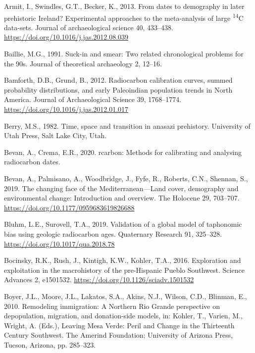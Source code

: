 \documentclass[
]{sa}
\newlength{\cslhangindent}
\newenvironment{cslreferences}%
  {\setlength{\parindent}{0pt}%
  \everypar{\setlength{\hangindent}{\cslhangindent}}\ignorespaces}%
  {\par}
\begin{document}
\hypertarget{refs}{}
\begin{cslreferences}
\leavevmode\hypertarget{ref-Armit2013}{}%
Armit, I., Swindles, G.T., Becker, K., 2013. From dates to demography in later prehistoric Ireland? Experimental approaches to the meta-analysis of large \textsuperscript{14}C data-sets. Journal of archaeological science 40, 433--438. \url{https://doi.org/10.1016/j.jas.2012.08.039}

\leavevmode\hypertarget{ref-Baillie1991}{}%
Baillie, M.G., 1991. Suck-in and smear: Two related chronological problems for the 90s. Journal of theoretical archaeology 2, 12--16.

\leavevmode\hypertarget{ref-Bamforth2012}{}%
Bamforth, D.B., Grund, B., 2012. Radiocarbon calibration curves, summed probability distributions, and early Paleoindian population trends in North America. Journal of Archaeological Science 39, 1768--1774. \url{https://doi.org/10.1016/j.jas.2012.01.017}

\leavevmode\hypertarget{ref-Berry1982}{}%
Berry, M.S., 1982. Time, space and transition in anasazi prehistory. University of Utah Press, Salt Lake City, Utah.

\leavevmode\hypertarget{ref-rcarbon}{}%
Bevan, A., Crema, E.R., 2020. rcarbon: Methods for calibrating and analysing radiocarbon dates.

\leavevmode\hypertarget{ref-Bevan2019}{}%
Bevan, A., Palmisano, A., Woodbridge, J., Fyfe, R., Roberts, C.N., Shennan, S., 2019. The changing face of the Mediterranean---Land cover, demography and environmental change: Introduction and overview. The Holocene 29, 703--707. \url{https://doi.org/10.1177/0959683619826688}

\leavevmode\hypertarget{ref-Bluhm2019}{}%
Bluhm, L.E., Surovell, T.A., 2019. Validation of a global model of taphonomic bias using geologic radiocarbon ages. Quaternary Research 91, 325--328. \url{https://doi.org/10.1017/qua.2018.78}

\leavevmode\hypertarget{ref-Bocinsky2016}{}%
Bocinsky, R.K., Rush, J., Kintigh, K.W., Kohler, T.A., 2016. Exploration and exploitation in the macrohistory of the pre-Hispanic Pueblo Southwest. Science Advances 2, e1501532. \url{https://doi.org/10.1126/sciadv.1501532}

\leavevmode\hypertarget{ref-Boyer2010}{}%
Boyer, J.L., Moore, J.L., Lakatos, S.A., Akins, N.J., Wilson, C.D., Blinman, E., 2010. Remodeling immigration: A Northern Rio Grande perspective on depopulation, migration, and donation-side models, in: Kohler, T., Varien, M., Wright, A. (Eds.), Leaving Mesa Verde: Peril and Change in the Thirteenth Century Southwest. The Amerind Foundation; University of Arizona Press, Tucson, Arizona, pp. 285--323.


\end{cslreferences}
\end{document}
